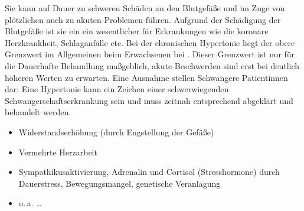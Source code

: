  Sie kann auf
Dauer zu schweren Schäden an den Blutgefäße und im Zuge 
von plötzlichen  auch zu akuten
Problemen führen. Aufgrund der Schädigung der Blutgefäße
ist sie ein ein wesentlicher  für
Erkrankungen wie die koronare Herzkrankheit, Schlaganfälle
etc. 
Bei der chronischen Hypertonie liegt der obere
Grenzwert im Allgemeinen 
beim Erwachsenen bei . Dieser Grenzwert
ist nur für die Dauerhafte Behandlung maßgeblich, akute
Beschwerden sind erst bei deutlich höheren Werten zu
erwarten. Eine Ausnahme stellen Schwangere Patientinnen dar:
Eine Hypertonie kann ein Zeichen einer schwerwiegenden
Schwangerschaftserkrankung sein und muss zeitnah
entsprechend abgeklärt und behandelt werden.




{
\begin{itemize}
  \item Widerstandserhöhung (durch Engstellung der Gefäße)
  \item Vermehrte Herzarbeit
  \item Sympathikusaktivierung, Adrenalin und Cortisol
  (Stresshormone) durch Dauerstress,  Bewegungsmangel, genetische Veranlagung
  \item u.\,a. \ldots
\end{itemize}

}
{

}{}{}{}


